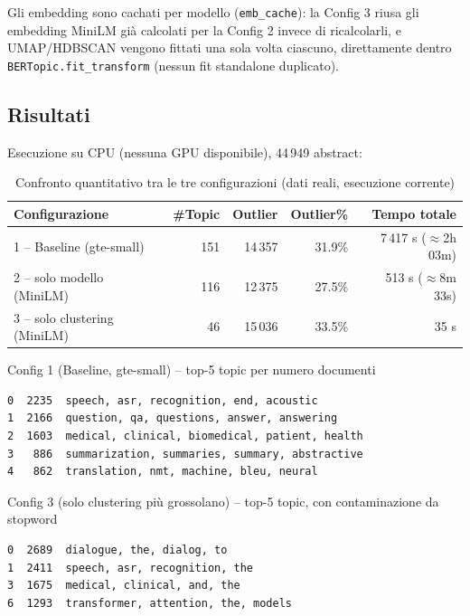 \documentclass[12pt,a4paper]{article}
\begin{document}
Gli embedding sono cachati per modello (\texttt{emb\_cache}): la Config 3 riusa gli embedding MiniLM gi\`a calcolati per la Config 2 invece di ricalcolarli, e UMAP/HDBSCAN vengono fittati una sola volta ciascuno, direttamente dentro \texttt{BERTopic.fit\_transform} (nessun fit standalone duplicato).

\subsection{Risultati}

Esecuzione su CPU (nessuna GPU disponibile), 44\,949 abstract:

\begin{table}[H]
  \centering
  \caption{Confronto quantitativo tra le tre configurazioni (dati reali, esecuzione corrente)}
  \begin{tabular}{lrrrr}
    \toprule
    \textbf{Configurazione} & \textbf{\#Topic} & \textbf{Outlier} & \textbf{Outlier\%} & \textbf{Tempo totale} \\
    \midrule
    1 -- Baseline (gte-small)          & 151 & 14\,357 & 31.9\% & 7\,417 s ($\approx$2h 03m) \\
    2 -- solo modello (MiniLM)         & 116 & 12\,375 & 27.5\% & 513 s ($\approx$8m 33s) \\
    3 -- solo clustering (MiniLM)      &  46 & 15\,036 & 33.5\% & 35 s \\
    \bottomrule
  \end{tabular}
\end{table}

\begin{exbox}{Config 1 (Baseline, gte-small) -- top-5 topic per numero documenti}
\begin{verbatim}
0  2235  speech, asr, recognition, end, acoustic
1  2166  question, qa, questions, answer, answering
2  1603  medical, clinical, biomedical, patient, health
3   886  summarization, summaries, summary, abstractive
4   862  translation, nmt, machine, bleu, neural
\end{verbatim}
\end{exbox}

\begin{exbox}{Config 3 (solo clustering pi\`u grossolano) -- top-5 topic, con contaminazione da stopword}
\begin{verbatim}
0  2689  dialogue, the, dialog, to
1  2411  speech, asr, recognition, the
3  1675  medical, clinical, and, the
6  1293  transformer, attention, the, models
\end{verbatim}
\end{exbox}
\end{document}

